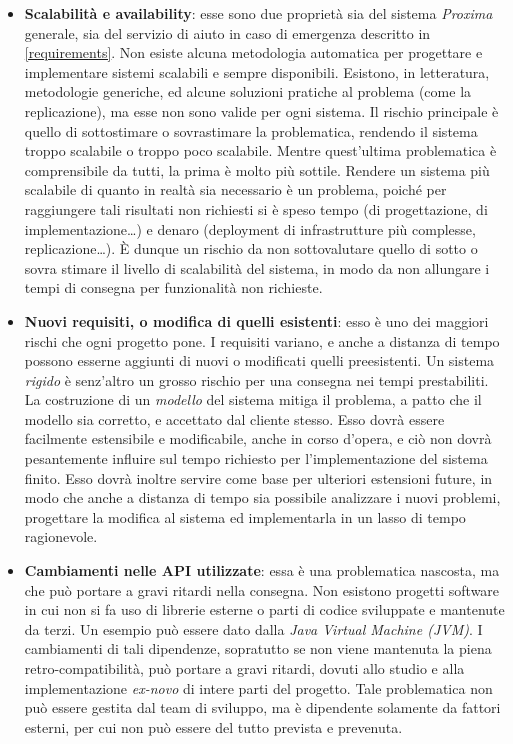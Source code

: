 \documentclass[a4paper,12pt]{report}
\begin{document}
\begin{itemize}
	\item \textbf{Scalabilità e availability}: esse sono due proprietà sia del sistema \emph{Proxima} generale, sia del servizio di aiuto in caso di emergenza descritto in \autoref{requirements}. Non esiste alcuna metodologia automatica per progettare e implementare sistemi scalabili e sempre disponibili. Esistono, in letteratura, metodologie generiche, ed alcune soluzioni pratiche al problema (come la replicazione), ma esse non sono valide per ogni sistema. Il rischio principale è quello di sottostimare o sovrastimare la problematica, rendendo il sistema troppo scalabile o troppo poco scalabile. Mentre quest'ultima problematica è comprensibile da tutti, la prima è molto più sottile. Rendere un sistema più scalabile di quanto in realtà sia necessario è un problema, poiché per raggiungere tali risultati non richiesti si è speso tempo (di progettazione, di implementazione\dots) e denaro (deployment di infrastrutture più complesse, replicazione\dots). \`{E} dunque un rischio da non sottovalutare quello di sotto o sovra stimare il livello di scalabilità del sistema, in modo da non allungare i tempi di consegna per funzionalità non richieste. 
	\item \textbf{Nuovi requisiti, o modifica di quelli esistenti}: esso è uno dei maggiori rischi che ogni progetto pone. I requisiti variano, e anche a distanza di tempo possono esserne aggiunti di nuovi o modificati quelli preesistenti. Un sistema \emph{rigido} è senz'altro un grosso rischio per una consegna nei tempi prestabiliti. La costruzione di un \emph{modello} del sistema mitiga il problema, a patto che il modello sia corretto, e accettato dal cliente stesso. Esso dovrà essere facilmente estensibile e modificabile, anche in corso d'opera, e ciò non dovrà pesantemente influire sul tempo richiesto per l'implementazione del sistema finito. Esso dovrà inoltre servire come base per ulteriori estensioni future, in modo che anche a distanza di tempo sia possibile analizzare i nuovi problemi, progettare la modifica al sistema ed implementarla in un lasso di tempo ragionevole. 
	\item \textbf{Cambiamenti nelle API utilizzate}: essa è una problematica nascosta, ma che può portare a gravi ritardi nella consegna. Non esistono progetti software in cui non si fa uso di librerie esterne o parti di codice sviluppate e mantenute da terzi. Un esempio può essere dato dalla \emph{Java Virtual Machine (JVM)}. I cambiamenti di tali dipendenze, sopratutto se non viene mantenuta la piena retro-compatibilità, può portare a gravi ritardi, dovuti allo studio e alla implementazione \emph{ex-novo} di intere parti del progetto. Tale problematica non può essere gestita dal team di sviluppo, ma è dipendente solamente da fattori esterni, per cui non può essere del tutto prevista e prevenuta.
\end{itemize}
\end{document}
